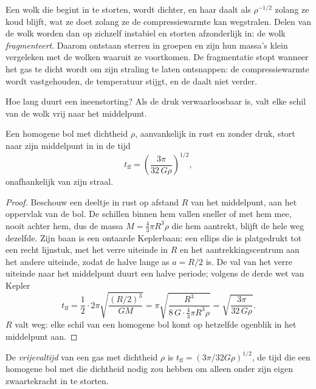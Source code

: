 Een wolk die begint in te storten, wordt dichter, en haar  daalt als
$\rho^{-1/2}$ zolang ze koud blijft, wat ze doet zolang ze de
compressiewarmte kan wegstralen. Delen van de wolk worden dan op zichzelf instabiel
en storten afzonderlijk in: de wolk \emph{fragmenteert}. Daarom ontstaan sterren
in groepen en zijn hun massa's klein vergeleken met de wolken waaruit ze
voortkomen. De fragmentatie stopt wanneer het gas te dicht wordt om zijn straling te laten
ontsnappen: de compressiewarmte wordt vastgehouden, de temperatuur stijgt, en de
 daalt niet verder.

Hoe lang duurt een ineenstorting? Als de druk verwaarloosbaar is, valt elke schil van de
wolk vrij naar het middelpunt.

\begin{proposition}[Vrijevaltijd]\label{prop:b2:ism-star-formation:free-fall}
Een homogene bol met dichtheid $\rho$, aanvankelijk in rust en zonder druk,
stort naar zijn middelpunt in in de tijd
\[
  t_{\mathrm{ff}} = \left(\frac{3\pi}{32\,G\rho}\right)^{1/2},
\]
onafhankelijk van zijn straal.
\end{proposition}

\begin{proof}
Beschouw een deeltje in rust op afstand $R$ van het middelpunt, aan het
oppervlak van de bol. De schillen binnen hem vallen sneller of met hem mee, nooit
achter hem, dus de massa $M = \tfrac43\pi R^3\rho$ die hem aantrekt, blijft de hele weg
dezelfde. Zijn baan is een ontaarde Keplerbaan: een ellips die is platgedrukt tot
een recht lijnstuk, met het verre uiteinde in $R$ en het aantrekkingscentrum aan
het andere uiteinde, zodat de halve lange as $a = R/2$ is. De val van het verre uiteinde
naar het middelpunt duurt een halve periode; volgens de derde wet van Kepler
\[
  t_{\mathrm{ff}} = \frac12\cdot 2\pi\sqrt{\frac{(R/2)^3}{GM}}
  = \pi\sqrt{\frac{R^3}{8\,G\cdot\frac43\pi R^3\rho}}
  = \sqrt{\frac{3\pi}{32\,G\rho}} .
\]
$R$ valt weg: elke schil van een homogene bol komt op hetzelfde
ogenblik in het middelpunt aan.
\end{proof}

\begin{definition}[Vrijevaltijd]\label{def:b2:ism-star-formation:free-fall}
De \emph{vrijevaltijd} van een gas met dichtheid $\rho$ is
$t_{\mathrm{ff}} = (3\pi/32G\rho)^{1/2}$, de tijd die een homogene bol met die
dichtheid nodig zou hebben om alleen onder zijn eigen zwaartekracht in te storten.
\end{definition}

